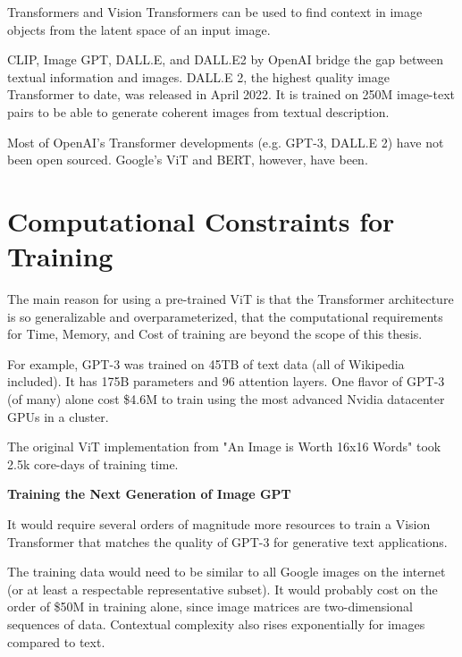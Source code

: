Transformers and Vision Transformers can be used to find context in image objects from the latent space of an input image.

CLIP, Image GPT, DALL.E, and DALL.E2 by OpenAI bridge the gap between textual information and images.
DALL.E 2, the highest quality image Transformer to date, was released in April 2022.
It is trained on 250M image-text pairs to be able to generate coherent images from textual description. \citep{Dalle2}

\vspace{1mm}

Most of OpenAI's Transformer developments (e.g. GPT-3, DALL.E 2) have not been open sourced. 
Google's ViT and BERT, however, have been.


\section{Computational Constraints for Training}


The main reason for using a pre-trained ViT is that the Transformer architecture is so generalizable and 
overparameterized, that the computational requirements for Time, Memory, and Cost of training 
are beyond the scope of this thesis. 


For example, GPT-3 was trained on 45TB of text data (all of Wikipedia included). It has 175B parameters and 96 attention layers. \citep{GPT3}
One flavor of GPT-3 (of many) alone cost \$4.6M to train using the most advanced Nvidia datacenter GPUs in a cluster.

The original ViT implementation from "An Image is Worth 16x16 Words" took 2.5k core-days of training time. \citep{dosovitskiy2020vit} 

\vspace{10mm}

\textbf{Training the Next Generation of Image GPT}

It would require several orders of magnitude more resources to train a Vision Transformer that matches the quality of GPT-3 
for generative text applications.

The training data would need to be similar to all Google images on the internet (or at least a respectable representative subset).
It would probably cost on the order of \$50M in training alone, since image matrices are two-dimensional sequences of data.
Contextual complexity also rises exponentially for images compared to text.










